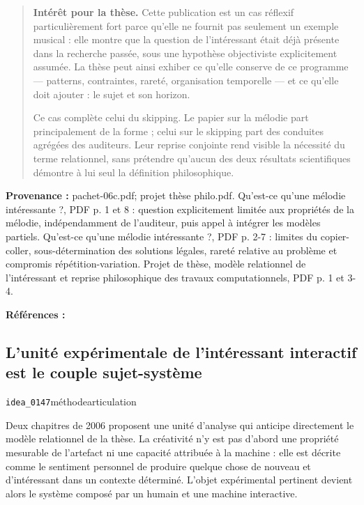 \documentclass[10pt,a4paper]{article}
\begin{document}
\begin{quote}
\textbf{Intérêt pour la thèse.} Cette publication est un cas réflexif particulièrement fort parce qu'elle ne fournit pas seulement un exemple musical : elle montre que la question de l'intéressant était déjà présente dans la recherche passée, sous une hypothèse objectiviste explicitement assumée. La thèse peut ainsi exhiber ce qu'elle conserve de ce programme — patterns, contraintes, rareté, organisation temporelle — et ce qu'elle doit ajouter : le sujet et son horizon.

Ce cas complète celui du skipping. Le papier sur la mélodie part principalement de la forme ; celui sur le skipping part des conduites agrégées des auditeurs. Leur reprise conjointe rend visible la nécessité du terme relationnel, sans prétendre qu'aucun des deux résultats scientifiques démontre à lui seul la définition philosophique.
\end{quote}
{\footnotesize\color{metadata}\textbf{Provenance :} pachet-06c.pdf; projet thèse philo.pdf. Qu'est-ce qu'une mélodie intéressante ?, PDF p. 1 et 8 : question explicitement limitée aux propriétés de la mélodie, indépendamment de l'auditeur, puis appel à intégrer les modèles partiels. Qu'est-ce qu'une mélodie intéressante ?, PDF p. 2-7 : limites du copier-coller, sous-détermination des solutions légales, rareté relative au problème et compromis répétition-variation. Projet de thèse, modèle relationnel de l'intéressant et reprise philosophique des travaux computationnels, PDF p. 1 et 3-4.\par}
{\footnotesize\color{metadata}\textbf{Références :} \parencite{pachet2000melodie}\par}

\subsection{L'unité expérimentale de l'intéressant interactif est le couple sujet-système}
{\small\color{metadata} \texttt{idea\_0147}\quad\textbullet\quad méthode\quad\textbullet\quad articulation\par}

Deux chapitres de 2006 proposent une unité d'analyse qui anticipe directement le modèle relationnel de la thèse. La créativité n'y est pas d'abord une propriété mesurable de l'artefact ni une capacité attribuée à la machine : elle est décrite comme le sentiment personnel de produire quelque chose de nouveau et d'intéressant dans un contexte déterminé. L'objet expérimental pertinent devient alors le système composé par un humain et une machine interactive.
\end{document}
